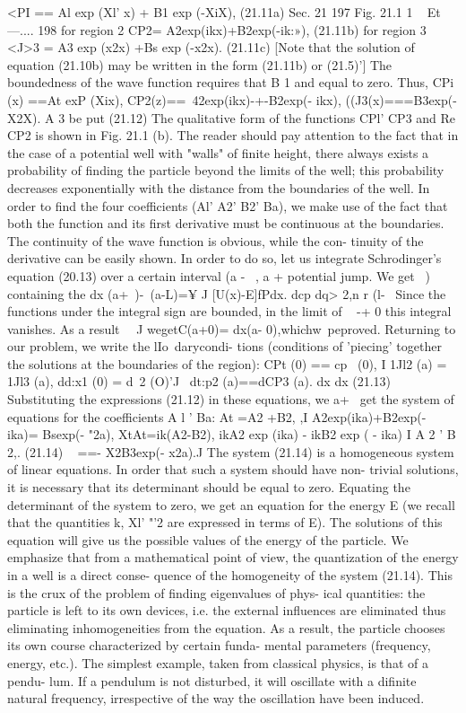 \documentclass[a4paper,sfsidenotes,colorlinks=true]{tufte-book}
\numberwithin{equation}{section}
\numberwithin{figure}{section}
\begin{document}
{{{<PI == Al exp (Xl' x) + B1 exp (-XiX),	(21.11a) Sec. 21
197
Fig. 21.1
1
~ Et---....
198
for region 2 CP2= A2exp(ikx)+B2exp(-ik:»),	(21.11b)
for region 3
<J>3 = A3 exp (x2x) +Bs exp (-x2x).	(21.11c)
[Note that the solution of equation (21.10b) may be written in the form (21.11b) or (21.5)'] The boundedness
of	the	wave	function	requires	that	B 1	and equal to zero. Thus,
CPi (x) ==At exP (Xix), CP2(z)==~42exp(ikx)-+-B2exp(- ikx), ((J3(x)===B3exp(- X2X).
A 3
be	put
(21.12)
The qualitative form of the functions CPl' CP3 and Re {CP2} is shown in Fig. 21.1 (b). The reader should pay attention to the fact that in the case of a potential well with "walls" of finite height, there always exists a probability of finding the particle beyond the limits of the well; this probability decreases exponentially with the distance from the boundaries of the well.
In order to find the four coefficients (Al' A2' B2' Ba), we make use of the fact that both the function and its first derivative must be continuous at the boundaries. The continuity of the wave function is obvious, while the con- tinuity of the derivative can be easily shown. In order to do so, let us integrate Schrodinger's equation (20.13)
over a certain interval (a - ~, a + potential jump. We get
~) containing the dx	(a+~)-~(a-L)=¥ J	[U(x)-E]fPdx.
dcp	dq>	2,n r (l-~
Since the functions under the integral sign are bounded, in the limit of ~ -+ 0 this integral vanishes. As a result
~~J wegetC(a+0)= dx(a- 0),whichw~peproved.
Returning to our problem, we write the lIo~darycondi- tions (conditions of 'piecing' together the solutions at the boundaries of the region):
CPt (0) == cp~ (0),	I 1Jl2 (a) = 1Jl3 (a),
dd:x1	(0) = d~2 (O)'J~ dt:p2 (a)==dCP3 (a).
dx	dx
(21.13)
Substituting the expressions (21.12) in these equations, we
a+~
get the system of equations for the coefficients A l ' Ba:
At =A2 +B2,	,I A2exp(ika)+B2exp(- ika)= Bsexp(- "2a),
XtAt=ik(A2-B2), ikA2 exp (ika) -	ikB2 exp ( - ika)	I
A 2 '	B 2,.
(21.14)
~
==- X2B3exp(- x2a).J
The system (21.14) is a homogeneous system of linear equations. In order that such a system should have non- trivial solutions, it is necessary that its determinant should be equal to zero. Equating the determinant of the system to zero, we get an equation for the energy E (we recall that the quantities k, Xl' "'2 are expressed in terms of E). The solutions of this equation will give us the possible values of the energy of the particle.
We emphasize that from a mathematical point of view, the quantization of the energy in a well is a direct conse- quence of the homogeneity of the system (21.14). This is the crux of the problem of finding eigenvalues of phys- ical quantities: the particle is left to its own devices, i.e. the external influences are eliminated thus eliminating inhomogeneities from the equation. As a result, the particle chooses its own course characterized by certain funda- mental parameters (frequency, energy, etc.). The simplest example, taken from classical physics, is that of a pendu- lum. If a pendulum is not disturbed, it will oscillate with a difinite natural frequency, irrespective of the way the oscillation have been induced.
}}}
\end{document}
